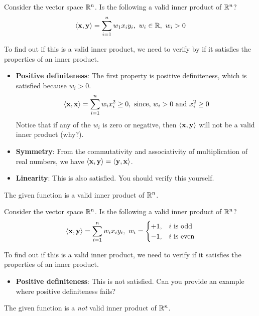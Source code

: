 \begin{boxedstuff}
\begin{problem}
    Consider the vector space $\mathbb{R}^n$. Is the following a valid inner product of $\mathbb{R}^n$?
    \[ \langle \mathbf{x}, \mathbf{y}\rangle = \sum_{i=1}^n w_1 x_i y_i, \,\, w_i \in \mathbb{R}, \,\, w_i > 0 \]
    \begin{solution}
        To find out if this is a valid inner product, we need to verify by if it satisfies the properties of an inner product. 
        \begin{itemize}
            \item \textbf{Positive definiteness}: The first property is positive definiteness, which is satisfied because $w_i > 0$.
            \[ \langle \mathbf{x}, \mathbf{x} \rangle = \sum_{i=1}^n w_i x_i^2 \geq 0, \,\, \text{since, } w_i > 0 \text{ and } x_i^2 \geq 0 \]
            Notice that if any of the $w_i$ is zero or negative, then $\langle \mathbf{x}, \mathbf{y} \rangle$ will not be a valid inner product (why?).
            \item \textbf{Symmetry}: From the commutativity and associativity of multiplication of real numbers, we have $\langle \mathbf{x}, \mathbf{y} \rangle = \langle \mathbf{y}, \mathbf{x} \rangle$. 
        
            \item\textbf{Linearity}: This is also satisfied. You should verify this yourself.
        \end{itemize}
        The given function is a valid inner product of $\mathbb{R}^n$.
    \end{solution}
\end{problem}
\begin{problem}
    Consider the vector space $\mathbb{R}^n$. Is the following a valid inner product of $\mathbb{R}^n$?
    \[ \langle \mathbf{x}, \mathbf{y}\rangle = \sum_{i=1}^n w_i x_i y_i, \,\, w_i = \begin{cases} +1, & i \text{ is odd} \\  -1, & i \text{ is even}\end{cases} \]
    \begin{solution}
        To find out if this is a valid inner product, we need to verify if it satisfies the properties of an inner product. 
        \begin{itemize}
            \item \textbf{Positive definiteness}: This is not satisfied. Can you provide an example where positive definiteness fails?
        \end{itemize}
        The given function is a \textit{not} valid inner product of $\mathbb{R}^n$.
    \end{solution}
\end{problem}
\end{boxedstuff}

